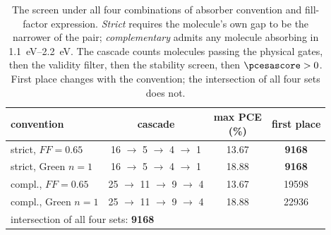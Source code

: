 \begin{table}[t]
\centering
\caption{The screen under all four combinations of absorber convention and fill-factor expression. \emph{Strict} requires the molecule's own gap to be the narrower of the pair; \emph{complementary} admits any molecule absorbing in \qtyrange{1.1}{2.2}{\electronvolt}. The cascade counts molecules passing the physical gates, then the validity filter, then the stability screen, then $\pcesascore > 0$. First place changes with the convention; the intersection of all four sets does not.}
\label{tab:conventions}
\begin{tabular}{lccc}
\toprule
convention & cascade & \makecell{max PCE\\(\unit{\percent})} & first place \\
\midrule
strict, $FF = 0.65$ & 16 $\to$ 5 $\to$ 4 $\to$ 1 & 13.67 & \textbf{9168} \\
strict, Green $n = 1$ & 16 $\to$ 5 $\to$ 4 $\to$ 1 & 18.88 & \textbf{9168} \\
compl., $FF = 0.65$ & 25 $\to$ 11 $\to$ 9 $\to$ 4 & 13.67 & 19598 \\
compl., Green $n = 1$ & 25 $\to$ 11 $\to$ 9 $\to$ 4 & 18.88 & 22936 \\
\midrule
\multicolumn{4}{l}{intersection of all four sets: \textbf{9168}} \\
\bottomrule
\end{tabular}
\end{table}
